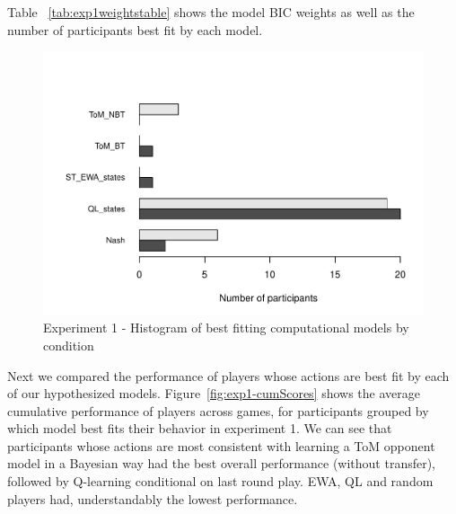\documentclass[man,floatsintext]{apa6}
\begin{document}
Table ~\ref{tab:exp1weightstable} shows the model BIC weights as well as the number of participants best fit by each model.

\begin{figure}

{\centering \includegraphics{draft_report_v3_files/figure-latex/exp1-comp-models-1} 

}

\caption{Experiment 1 - Histogram of best fitting computational models by condition}\label{fig:exp1-comp-models}
\end{figure}

Next we compared the performance of players whose actions are best fit by each of our hypothesized models. Figure~\ref{fig:exp1-cumScores} shows the average cumulative performance of players across games, for participants grouped by which model best fits their behavior in experiment 1. We can see that participants whose actions are most consistent with learning a ToM opponent model in a Bayesian way had the best overall performance (without transfer), followed by Q-learning conditional on last round play. EWA, QL and random players had, understandably the lowest performance.
\end{document}
